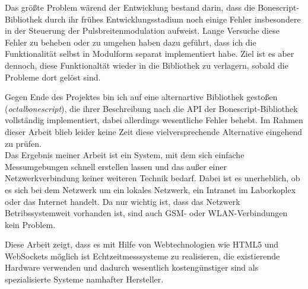 Das größte Problem wärend der Entwicklung bestand darin, dass die Bonescript-Bibliothek durch ihr frühes Entwicklungsstadium noch einige Fehler insbesondere in der Steuerung der Pulsbreitenmodulation aufweist. Lange Versuche diese Fehler zu beheben oder zu umgehen haben dazu geführt, dass ich die Funktionalität selbst in Modulform separat implementiert habe. Ziel ist es aber dennoch, diese Funktionaltät wieder in die Bibliothek zu verlagern, sobald die Probleme dort gelöst sind. 

Gegen Ende des Projektes bin ich auf eine alternartive Bibliothek gestoßen (\textit{octalbonescript}), die ihrer Beschreibung nach die API der Bonescript-Bibliothek vollständig implementiert, dabei allerdings wesentliche Fehler behebt. Im Rahmen dieser Arbeit blieb leider keine Zeit diese vielversprechende Alternative eingehend zu prüfen.\\

Das Ergebnis meiner Arbeit ist ein System, mit dem sich einfache Messumgebungen schnell erstellen lassen und das außer einer Netzwerkverbindung keiner weiteren Technik bedarf. Dabei ist es unerheblich, ob es sich bei dem Netzwerk um ein lokales Netzwerk, ein Intranet im Laborkoplex oder das Internet handelt. Da nur wichtig ist, dass das Netzwerk Betribssystemweit vorhanden ist, sind auch GSM- oder WLAN-Verbindungen kein Problem.

Diese Arbeit zeigt, dass es mit Hilfe von Webtechnologien wie HTML5 und WebSockets möglich ist Echtzeitmesssysteme zu realisieren, die existierende Hardware verwenden und dadurch wesentlich kostengünstiger sind als spezialisierte Systeme namhafter Hersteller.